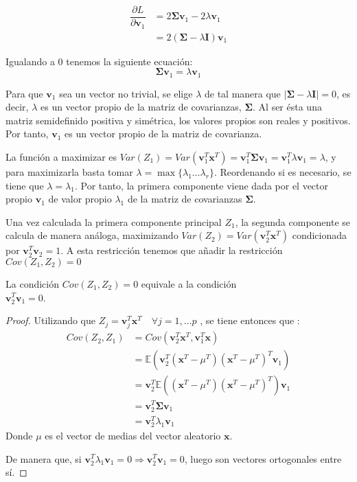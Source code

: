 \begin{align*}
\dfrac{\partial L}{\partial \textbf{v}_1} &= 2\mathbf{\Sigma} \textbf{v}_1 - 2\lambda\textbf{v}_1\\
& = 2(\mathbf{\Sigma}-\lambda\mathbf{I})\textbf{v}_1 
\end{align*}

\noindent Igualando a 0 tenemos la siguiente ecuación: 
\begin{equation}
\mathbf{\Sigma}\textbf{v}_1=\lambda \textbf{v}_1
\end{equation}

\noindent Para que $\textbf{v}_1$ sea un vector no trivial, se elige $\lambda$ de tal manera que $|\mathbf{\Sigma}-\lambda \mathbf{I}| = 0$, es decir, $\lambda$ es un vector propio de la matriz de covarianzas, $\mathbf{\Sigma}$. Al ser ésta una matriz semidefinido positiva y simétrica, los valores propios son reales y positivos. Por tanto, $\textbf{v}_1$ es un vector propio de la matriz de covarianza.

\noindent La función a maximizar es $Var(Z_1)=Var(\textbf{v}_1^T\textbf{x}^T)=\textbf{v}_1^T\mathbf{\Sigma} \textbf{v}_1=\textbf{v}_1^T\lambda \textbf{v}_1=\lambda$, y para maximizarla basta tomar $\lambda=\max{\lbrace\lambda_1\ldots \lambda_r\rbrace}$. Reordenando si es necesario, se tiene que $\lambda=\lambda_1$. Por tanto, la primera componente viene dada por el vector propio $\mathbf{v}_1$ de valor propio $\lambda_1$ de la matriz de covarianzas $\mathbf{\Sigma}$.

\noindent Una vez calculada la primera componente principal $Z_1$, la segunda componente se calcula de manera análoga, maximizando $Var(Z_2)=Var(\textbf{v}_2^T\textbf{x}^T)$ condicionada por $\textbf{v}_2^T\textbf{v}_2=1$. A esta restricción tenemos que añadir la restricción $Cov(Z_1,Z_2)=0 $

\begin{propo}
La condición $Cov(Z_1,Z_2)=0 $ equivale a la condición \\$\textbf{v}_2^T\textbf{v}_1 = 0$.
\begin{proof}
Utilizando que $Z_j=\textbf{v}_j^T \textbf{x}^T \quad \forall j=1,\ldots p$ , se tiene entonces que :
\begin{align*}
Cov(Z_2,Z_1)&= Cov (\textbf{v}_2^T\mathbf{x}^T,\mathbf{v}_1^T\mathbf{x})\\ 
&= \mathbb{E}(\mathbf{v}_2^T(\mathbf{x}^T-\mu^T)(\mathbf{x}^T-\mu^T)^T \mathbf{v}_1)\\
&= \textbf{v}_2^T \mathbb{E}((\textbf{x}^T-\mu^T)(\mathbf{x}^T-\mu^T)^T) \textbf{v}_1\\
&= \textbf{v}_2^T \mathbf{\Sigma} \textbf{v}_1 \\
&= \textbf{v}_2^T \lambda_1 \textbf{v}_1
\end{align*}
\noindent Donde $\mu$ es el vector de medias del vector aleatorio $\mathbf{x}$. 

\noindent De manera que, si $\mathbf{v}_2^T \lambda_1 \mathbf{v}_1 = 0 \Rightarrow \mathbf{v}_2^T \mathbf{v}_1=0 $, luego son vectores ortogonales entre sí. 
\end{proof}
\end{propo}


